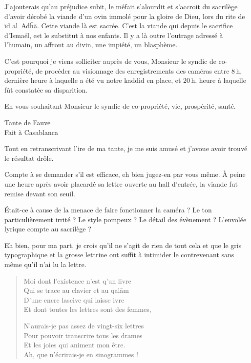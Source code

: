 J’ajouterais qu’au préjudice subit, le méfait s’alourdit et s’accroit du sacrilège d’avoir dérobé la viande d’un ovin immolé pour la gloire de Dieu, lors du rite de īd al Aḋĥā. Cette viande là est sacrée. C’est la viande qui depuis le sacrifice d’Ismaël, est le substitut à nos enfants. Il y a là outre l’outrage adressé à l’humain, un affront au divin, une
impiété, un blasphème.

C’est pourquoi je viens solliciter auprès de vous, Monsieur le syndic de co-propriété, de procéder au visionnage des enregistrements des caméras entre 8\,h, dernière heure à laquelle a été vu
notre kaddid en place, et 20\,h, heure à laquelle fût constatée sa disparition.

En vous souhaitant Monsieur le syndic de co-propriété, vie, prospérité, santé.
\nopagebreak\\\vspace{1cm}\nopagebreak
\hfill\nopagebreak
\begin{minipage}{4cm}
  \begin{center}
    \vspace{1cm}
    Tante de Fauve\\  %
    Fait à Casablanca
  \end{center}
\end{minipage}


\begin{prose}
  Tout en retranscrivant l’ire de ma tante, je me suis amusé et j’avoue avoir trouvé le résultat drôle.

  Compte à se demander s’il est efficace, eh bien jugez-en par vous même. À peine une heure après avoir placardé sa lettre ouverte au hall d’entrée, la viande fut remise devant son seuil.

  Était-ce à cause de la menace de faire fonctionner la caméra ? Le ton particulièrement irrité ? Le style pompeux ? Le détail des évènement ? L’envolée lyrique compte au sacrilège ?

  Eh bien, pour ma part, je crois qu’il ne s’agit de rien de tout cela et que le gris typographique et la grosse lettrine ont suffit à intimider le contrevenant sans même qu’il n’ai lu la lettre.
\end{prose}

\begin{verse}%
  \quatrain%
  Moi dont l’existence n’est q’un livre\\  %
  Qui se trace au clavier et au qalām\\  %
  D’une encre lascive qui laisse ivre\\  %
  Et dont toutes les lettres sont des femmes,

  N’aurais-je pas assez de vingt-six lettres\\  %
  Pour pouvoir transcrire tous les drames\\  %
  Et les joies  qui animent mon être.\\  %
  Ah, que n’écrirais-je en sinogrammes !
\end{verse}

